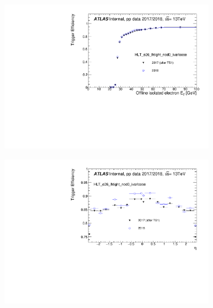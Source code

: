 
\begin{figure}[h!tb]
\centering
\begin{subfigure}[c]{.48\textwidth}
\includegraphics[width=\textwidth]{sections/operation/figures/efficiencies/eff_EGAM1_e26_lhtight_nod0_ivarloose_2017_after_ts1_and_2018_et.pdf}
\caption{}
\end{subfigure}
\hfill
\begin{subfigure}[c]{.48\textwidth}
\includegraphics[width=\textwidth]{sections/operation/figures/efficiencies/eff_EGAM1_e26_lhtight_nod0_ivarloose_2017_after_ts1_and_2018_eta.pdf}
\caption{}

\end{subfigure}
\end{figure}
